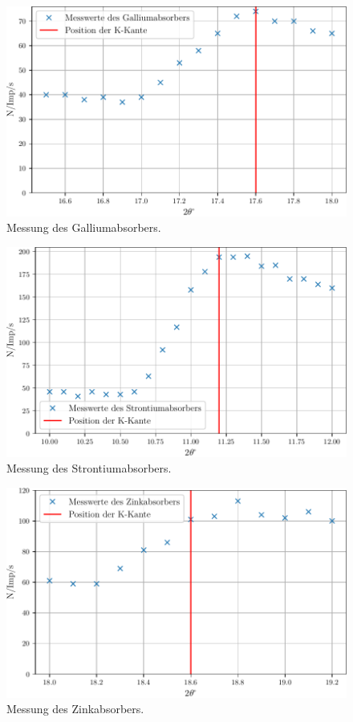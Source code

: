 \begin{figure}
  \centering
  \includegraphics{build/gallium.pdf}
  \caption{Messung des Galliumabsorbers.}
  \label{fig:gallium}
\end{figure}

\begin{figure}
  \centering
  \includegraphics{build/strontium.pdf}
  \caption{Messung des Strontiumabsorbers.}
  \label{fig:strontium}
\end{figure}

\begin{figure}
  \centering
  \includegraphics{build/zink.pdf}
  \caption{Messung des Zinkabsorbers.}
  \label{fig:zink}
\end{figure}

